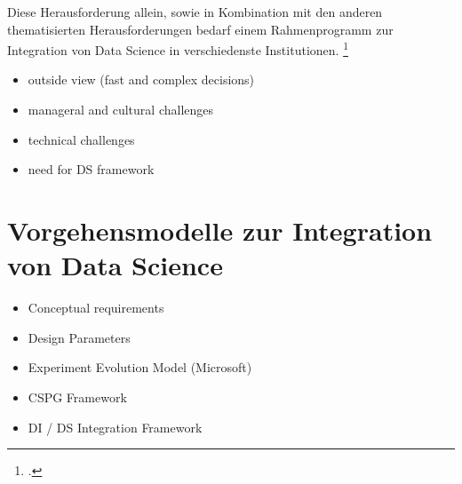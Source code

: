 Diese Herausforderung allein, sowie in Kombination mit den anderen thematisierten Herausforderungen bedarf einem Rahmenprogramm zur Integration von Data Science in verschiedenste Institutionen. \footcite[Vgl.][S. 1]{Saltz.2017}

\begin{itemize}
    \item outside view (fast and complex decisions)
    \item manageral and cultural challenges
    \item technical challenges
    \item need for DS framework
\end{itemize}

\section{Vorgehensmodelle zur Integration von Data Science}

\begin{itemize}
    \item Conceptual requirements
    \item Design Parameters
    \item Experiment Evolution Model (Microsoft)
    \item CSPG Framework
    \item DI / DS Integration Framework
\end{itemize}